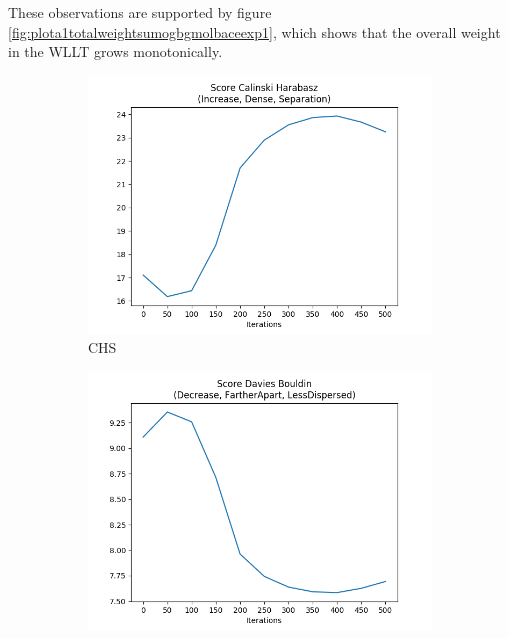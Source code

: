 		These observations are supported by figure \ref{fig:plota1totalweightsumogbgmolbaceexp1}, which shows that the overall weight in the WLLT grows monotonically.
				
		\begin{figure}[H]
			\centering
			\begin{subfigure}{0.3\textwidth}
				\centering
				\includegraphics[width=1.1\linewidth]{images/plotA1_Score_Calinski_Harabasz_ogbgMolbaceExp1}
				\caption{CHS}
				\label{fig:plota1scorecalinskiharabaszogbgmolbaceexp1}
			\end{subfigure}		
			\begin{subfigure}{0.3\textwidth}
				\centering
				\includegraphics[width=1.1\linewidth]{images/plotA1_Score_Davies_Bouldin_ogbgMolbaceExp1}

\end{subfigure}
\end{figure}
